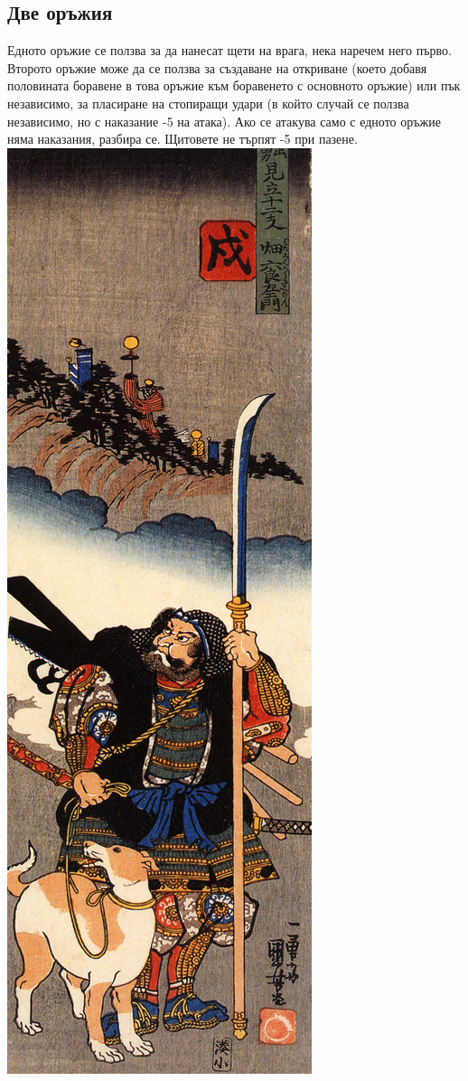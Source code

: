 \begin{multicols}{2}
\subsection{Две оръжия}
Едното оръжие се ползва за да нанесат щети на врага, нека наречем него първо.
Второто оръжие може да се ползва за създаване на откриване (което добавя половината боравене в това оръжие към боравенето с основното оръжие) или пък независимо, за пласиране на стопиращи удари (в който случай се ползва независимо, но с наказание -5 на атака).
Ако се атакува само с едното оръжие няма наказания, разбира се.
Щитовете не търпят -5 при пазене.
\includegraphics[height=0.8\textheight]{../images/naginata}~



\end{multicols}
